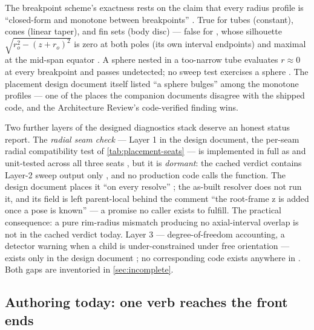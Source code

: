 \begin{hardfail}
The breakpoint scheme's exactness rests on the claim that every radius profile is
``closed-form and monotone between breakpoints'' .
True for tubes (constant), cones (linear taper), and fin sets (body disc) --- false for
, whose silhouette $\sqrt{r_o^2 - (z + r_o)^2}$ is zero at both poles
(its own interval endpoints) and maximal at the mid-span equator
. A sphere nested in a too-narrow tube evaluates
$r \approx 0$ at every breakpoint and passes undetected; no sweep test exercises a sphere
. The placement design document itself listed
``a sphere bulges'' among the monotone profiles --- one of the places the companion
documents disagree with the shipped code, and the Architecture Review's code-verified
finding wins. \fail
\end{hardfail}

Two further layers of the designed diagnostics stack deserve an honest status report. The
\emph{radial seam check} --- Layer 1 in the design document, the per-seam radial
compatibility test of \cref{tab:placement-seats} --- is implemented in full as
  and unit-tested across all
three seats , but it is \emph{dormant}: the
cached verdict contains Layer-2 sweep output only , and no
production code calls the function. The design document places it ``on every resolve''
; the as-built
resolver does not run it, and its  field is left parent-local behind the
comment ``the root-frame z is added once a pose is known''
 --- a promise no caller exists to fulfill. The
practical consequence: a pure rim-radius mismatch producing no axial-interval overlap is
not in the cached verdict today. Layer 3 --- degree-of-freedom accounting, a detector
warning when a child is under-constrained under free orientation --- exists only in the
design document ; no
corresponding code exists anywhere in . Both gaps are inventoried in
\cref{sec:incomplete}.

\subsection{Authoring today: one verb reaches the front ends}\label{sec:placement-authoring}

